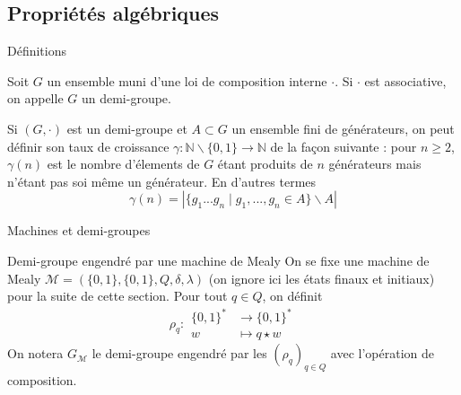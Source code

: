 \documentclass{beamer}
\begin{document}
\subsection{Propriétés algébriques}

\begin{frame}{Définitions}
    \begin{definition}
        Soit $G$ un ensemble muni d'une loi de composition interne $\cdot$. Si $\cdot$ est associative, on appelle $G$ un demi-groupe.
    \end{definition}
    
    \begin{definition}
        Si $(G, \cdot)$ est un demi-groupe et $A \subset G$ un ensemble fini de générateurs, on peut définir son taux de croissance
        $\gamma : \mathbb{N} \backslash \{0, 1\} \rightarrow \mathbb{N}$ de la façon suivante : pour $n \geq 2$, $\gamma(n)$ est le nombre d'élements
        de $G$ étant produits de $n$ générateurs mais n'étant pas soi même un générateur. En d'autres termes
        \[ \gamma(n) = |\{ g_1 ... g_n \mid g_1, ..., g_n \in A \} \backslash A| \]
    \end{definition}
\end{frame}

\begin{frame}{Machines et demi-groupes}
    \begin{definition}{Demi-groupe engendré par une machine de Mealy}
    On se fixe une machine de Mealy $\mathcal{M} = (\{0, 1\}, \{0, 1\}, Q, \delta, \lambda)$ (on ignore ici les états finaux et initiaux)
    pour la suite de cette section. Pour tout $q \in Q$, on définit
    \[ \rho_q : \begin{array}{cl}
        \{0, 1\}^* &\longrightarrow \{0, 1\}^*\\
        w &\longmapsto q \star w 
    \end{array} \]
    On notera $G_{\mathcal{M}}$ le demi-groupe engendré par les $(\rho_q)_{q \in Q}$ avec l'opération de composition.
\end{definition}
\end{frame}
\end{document}
